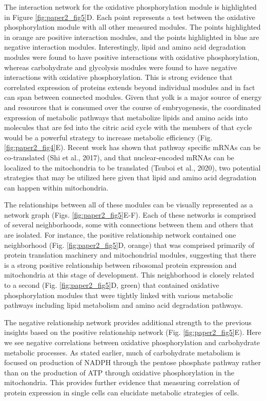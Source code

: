 The interaction network for the oxidative phosphorylation module is highlighted in Figure \ref{fig:paper2_fig5}D. Each point represents a test between the oxidative phosphorylation module with all other measured modules. The points highlighted in orange are positive interaction modules, and the points highlighted in blue are negative interaction modules. Interestingly, lipid and amino acid degradation modules were found to have positive interactions with oxidative phosphorylation, whereas carbohydrate and glycolysis modules were found to have negative interactions with oxidative phosphorylation. This is strong evidence that correlated expression of proteins extends beyond individual modules and in fact can span between connected modules. Given that yolk is a major source of energy and resources that is consumed over the course of embryogenesis, the coordinated expression of metabolic pathways that metabolize lipids and amino acids into molecules that are fed into the citric acid cycle with the members of that cycle would be a powerful strategy to increase metabolic efficiency (Fig. \ref{fig:paper2_fig4}E). Recent work has shown that pathway specific mRNAs can be co-translated (Shi et al., 2017), and that nuclear-encoded mRNAs can be localized to the mitochondria to be translated (Tsuboi et al., 2020), two potential strategies that may be utilized here given that lipid and amino acid degradation can happen within mitochondria.

The relationships between all of these modules can be visually represented as a network graph (Figs. \ref{fig:paper2_fig5}E-F). Each of these networks is comprised of several neighborhoods, some with connections between them and others that are isolated. For instance, the positive relationship network contained one neighborhood (Fig. \ref{fig:paper2_fig5}D, orange) that was comprised primarily of protein translation machinery and mitochondrial modules, suggesting that there is a strong positive relationship between ribosomal protein expression and mitochondria at this stage of development. This neighborhood is closely related to a second (Fig. \ref{fig:paper2_fig5}D, green) that contained oxidative phosphorylation modules that were tightly linked with various metabolic pathways including lipid metabolism and amino acid degradation pathways.  

The negative relationship network provides additional strength to the previous insights based on the positive relationship network (Fig. \ref{fig:paper2_fig5}E). Here we see negative correlations between oxidative phosphorylation and carbohydrate metabolic processes. As stated earlier, much of carbohydrate metabolism is focused on production of NADPH through the pentose phosphate pathway rather than on the production of ATP through oxidative phosphorylation in the mitochondria. This provides further evidence that measuring correlation of protein expression in single cells can elucidate metabolic strategies of cells.

